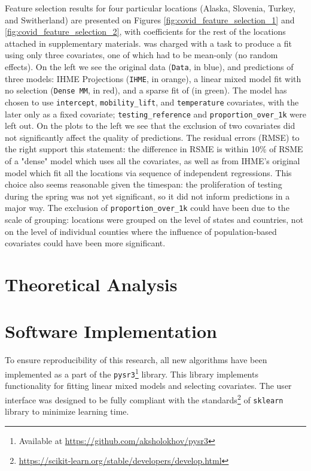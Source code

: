 Feature selection results for four particular locations (Alaska, Slovenia, Turkey, and Switherland) are presented on Figures \ref{fig:covid_feature_selection_1} and \ref{fig:covid_feature_selection_2}, with coefficients for the rest of the locations attached in supplementary materials. \ouralgo was charged with a task to produce a fit using only three covariates, one of which had to be mean-only (no random effects). On the left we see the original data (\texttt{Data}, in {\color{blue} blue}), and predictions of three models: IHME Projections (\texttt{IHME}, in {\color{orange} orange}), a linear mixed model fit with no selection (\texttt{Dense MM}, in {\color{red} red}), and a sparse fit of \ouralgo (\ouralgo in {\color{green} green}). The \ouralgo model has chosen to use \texttt{intercept}, \texttt{mobility\_lift}, and \texttt{temperature} covariates, with the later only as a fixed covariate; \texttt{testing\_reference} and \texttt{proportion\_over\_1k} were left out. On the plots to the left we see that the exclusion of two covariates did not significantly affect the quality of predictions. The residual errors (RMSE) to the right support this statement: the difference in RSME is within 10\% of RSME of a "dense" model which uses all the covariates, as well as from IHME's original model which fit all the locations via sequence of independent regressions. This choice also seems reasonable given the timespan: the proliferation of testing during the spring was not yet significant, so it did not inform predictions in a major way. The exclusion of \texttt{proportion\_over\_1k} could have been due to the scale of grouping: locations were grouped on the level of states and countries, not on the level of individual counties where the influence of population-based covariates could have been more significant. 




\section{Theoretical Analysis}


\section{Software Implementation}
To ensure reproducibility of this research, all new algorithms have been implemented as a part of the \texttt{pysr3}\footnote{Available at \href{https://github.com/aksholokhov/pysr3}{https://github.com/aksholokhov/pysr3}} library. This library implements functionality for fitting linear mixed models and selecting covariates. The user interface was designed to be fully compliant with the standards\footnote{\href{https://scikit-learn.org/stable/developers/develop.html}{https://scikit-learn.org/stable/developers/develop.html}} of \texttt{sklearn} library to minimize learning time. 

